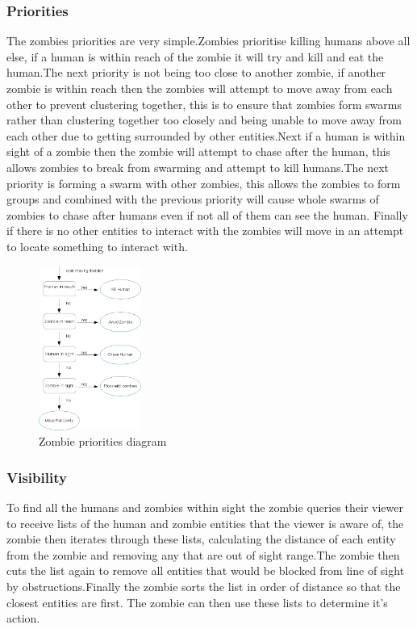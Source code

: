 \subsubsection{Priorities}
The zombies priorities are very simple.Zombies prioritise killing humans above all else, if a human is within reach of the zombie it will try and kill and eat the human.The next priority is not being too close to another zombie, if another zombie is within reach then the zombies will attempt to move away from each other to prevent clustering together, this is to ensure that zombies form swarms rather than clustering together too closely and being unable to move away from each other due to getting surrounded by other entities.Next if a human is within sight of a zombie then the zombie will attempt to chase after the human, this allows zombies to break from swarming and attempt to kill humans.The next priority is forming a swarm with other zombies, this allows the zombies to form groups and combined with the previous priority will cause whole swarms of zombies to chase after humans even if not all of them can see the human. Finally if there is no other entities to interact with the zombies will move in an attempt to locate something to interact with.
\begin{figure}[h]
  \centering
  \includegraphics[width=0.3\textwidth]{img/zombie_decision_tree.png}
\caption{Zombie priorities diagram}
    \label{fig:Zombie priorities diagram}
\end{figure}
\subsubsection{Visibility}
To find all the humans and zombies within sight the zombie queries their viewer to receive lists of the human and zombie entities that the viewer is aware of, the zombie then iterates through these lists, calculating the distance of each entity from the zombie and removing any that are out of sight range.The zombie then cuts the list again to remove all entities that would be blocked from line of sight by obstructions.Finally the zombie sorts the list in order of distance so that the closest entities are first.
The zombie can then use these lists to determine it's action.
